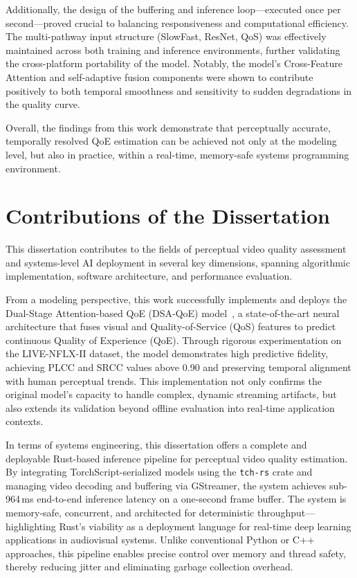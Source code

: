 Additionally, the design of the buffering and inference loop—executed once per second—proved crucial to balancing responsiveness and computational efficiency. The multi-pathway input structure (SlowFast, ResNet, QoS) was effectively maintained across both training and inference environments, further validating the cross-platform portability of the model. Notably, the model's Cross-Feature Attention and self-adaptive fusion components were shown to contribute positively to both temporal smoothness and sensitivity to sudden degradations in the quality curve.

Overall, the findings from this work demonstrate that perceptually accurate, temporally resolved QoE estimation can be achieved not only at the modeling level, but also in practice, within a real-time, memory-safe systems programming environment.

\section{Contributions of the Dissertation}

This dissertation contributes to the fields of perceptual video quality assessment and systems-level AI deployment in several key dimensions, spanning algorithmic implementation, software architecture, and performance evaluation.

From a modeling perspective, this work successfully implements and deploys the Dual-Stage Attention-based QoE (DSA-QoE) model~\cite{jia2024continuous}, a state-of-the-art neural architecture that fuses visual and Quality-of-Service (QoS) features to predict continuous Quality of Experience (QoE). Through rigorous experimentation on the LIVE-NFLX-II dataset, the model demonstrates high predictive fidelity, achieving PLCC and SRCC values above 0.90 and preserving temporal alignment with human perceptual trends. This implementation not only confirms the original model's capacity to handle complex, dynamic streaming artifacts, but also extends its validation beyond offline evaluation into real-time application contexts.

In terms of systems engineering, this dissertation offers a complete and deployable Rust-based inference pipeline for perceptual video quality estimation. By integrating TorchScript-serialized models using the \texttt{tch-rs} crate and managing video decoding and buffering via GStreamer, the system achieves sub-964\,ms end-to-end inference latency on a one-second frame buffer. The system is memory-safe, concurrent, and architected for deterministic throughput—highlighting Rust’s viability as a deployment language for real-time deep learning applications in audiovisual systems. Unlike conventional Python or C++ approaches, this pipeline enables precise control over memory and thread safety, thereby reducing jitter and eliminating garbage collection overhead.

